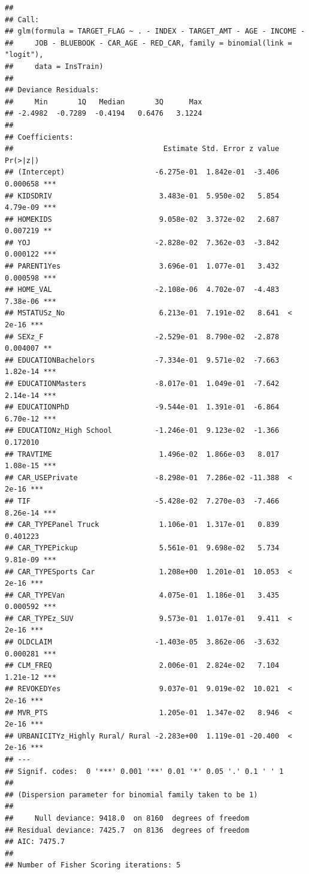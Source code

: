 \documentclass[]{article}
\begin{document}
\begin{verbatim}
## 
## Call:
## glm(formula = TARGET_FLAG ~ . - INDEX - TARGET_AMT - AGE - INCOME - 
##     JOB - BLUEBOOK - CAR_AGE - RED_CAR, family = binomial(link = "logit"), 
##     data = InsTrain)
## 
## Deviance Residuals: 
##     Min       1Q   Median       3Q      Max  
## -2.4982  -0.7289  -0.4194   0.6476   3.1224  
## 
## Coefficients:
##                                   Estimate Std. Error z value Pr(>|z|)    
## (Intercept)                     -6.275e-01  1.842e-01  -3.406 0.000658 ***
## KIDSDRIV                         3.483e-01  5.950e-02   5.854 4.79e-09 ***
## HOMEKIDS                         9.058e-02  3.372e-02   2.687 0.007219 ** 
## YOJ                             -2.828e-02  7.362e-03  -3.842 0.000122 ***
## PARENT1Yes                       3.696e-01  1.077e-01   3.432 0.000598 ***
## HOME_VAL                        -2.108e-06  4.702e-07  -4.483 7.38e-06 ***
## MSTATUSz_No                      6.213e-01  7.191e-02   8.641  < 2e-16 ***
## SEXz_F                          -2.529e-01  8.790e-02  -2.878 0.004007 ** 
## EDUCATIONBachelors              -7.334e-01  9.571e-02  -7.663 1.82e-14 ***
## EDUCATIONMasters                -8.017e-01  1.049e-01  -7.642 2.14e-14 ***
## EDUCATIONPhD                    -9.544e-01  1.391e-01  -6.864 6.70e-12 ***
## EDUCATIONz_High School          -1.246e-01  9.123e-02  -1.366 0.172010    
## TRAVTIME                         1.496e-02  1.866e-03   8.017 1.08e-15 ***
## CAR_USEPrivate                  -8.298e-01  7.286e-02 -11.388  < 2e-16 ***
## TIF                             -5.428e-02  7.270e-03  -7.466 8.26e-14 ***
## CAR_TYPEPanel Truck              1.106e-01  1.317e-01   0.839 0.401223    
## CAR_TYPEPickup                   5.561e-01  9.698e-02   5.734 9.81e-09 ***
## CAR_TYPESports Car               1.208e+00  1.201e-01  10.053  < 2e-16 ***
## CAR_TYPEVan                      4.075e-01  1.186e-01   3.435 0.000592 ***
## CAR_TYPEz_SUV                    9.573e-01  1.017e-01   9.411  < 2e-16 ***
## OLDCLAIM                        -1.403e-05  3.862e-06  -3.632 0.000281 ***
## CLM_FREQ                         2.006e-01  2.824e-02   7.104 1.21e-12 ***
## REVOKEDYes                       9.037e-01  9.019e-02  10.021  < 2e-16 ***
## MVR_PTS                          1.205e-01  1.347e-02   8.946  < 2e-16 ***
## URBANICITYz_Highly Rural/ Rural -2.283e+00  1.119e-01 -20.400  < 2e-16 ***
## ---
## Signif. codes:  0 '***' 0.001 '**' 0.01 '*' 0.05 '.' 0.1 ' ' 1
## 
## (Dispersion parameter for binomial family taken to be 1)
## 
##     Null deviance: 9418.0  on 8160  degrees of freedom
## Residual deviance: 7425.7  on 8136  degrees of freedom
## AIC: 7475.7
## 
## Number of Fisher Scoring iterations: 5
\end{verbatim}
\end{document}

